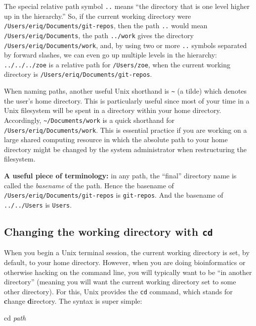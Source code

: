 \documentclass[]{krantz}
\let\BeginKnitrBlock\begin \let\EndKnitrBlock\end
\begin{document}
The special relative path symbol \texttt{..} means ``the directory that is one level higher up
in the hierarchy.'' So, if the current working directory were \texttt{/Users/eriq/Documents/git-repos},
then the path \texttt{..} would mean \texttt{/Users/eriq/Documents}, the path
\texttt{../work} gives the directory \texttt{/Users/eriq/Documents/work}, and, by using two or more \texttt{..} symbols
separated by forward slashes, we
can even go up multiple levels in the hierarchy: \texttt{../../../zoe} is a relative path for
\texttt{/Users/zoe}, when the current working directory is \texttt{/Users/eriq/Documents/git-repos}.

When naming paths, another
useful Unix shorthand is \texttt{\textasciitilde{}} (a tilde) which denotes the user's home directory. This is particularly
useful since most of your time in a Unix filesystem will be spent in a directory within your
home directory. Accordingly, \texttt{\textasciitilde{}/Documents/work} is a quick shorthand for
\texttt{/Users/eriq/Documents/work}. This is essential practice if you are working on a large shared computing
resource in which the absolute path to your home directory might be changed by the
system administrator when restructuring the filesystem.

\BeginKnitrBlock{rmdtip}
\textbf{A useful piece of terminology:} in any path, the ``final'' directory
name is called the \emph{basename} of the path. Hence the basename of \texttt{/Users/eriq/Documents/git-repos}
is \texttt{git-repos}. And the basename of \texttt{../../Users} is \texttt{Users}.
\EndKnitrBlock{rmdtip}

\hypertarget{changing-the-working-directory-with-cd}{%
\subsection{\texorpdfstring{Changing the working directory with \texttt{cd}}{Changing the working directory with cd}}\label{changing-the-working-directory-with-cd}}

When you begin a Unix terminal session, the current working
directory is set, by default, to your home directory. However, when you are doing
bioinformatics or otherwise hacking on the command line, you will typically
want to be ``in another directory'' (meaning you will want the current working
directory set to some other directory). For this, Unix provides the \texttt{cd} command, which
stands for \textbf{c}hange \textbf{d}irectory. The syntax is super simple:

cd \emph{path}
\end{document}
